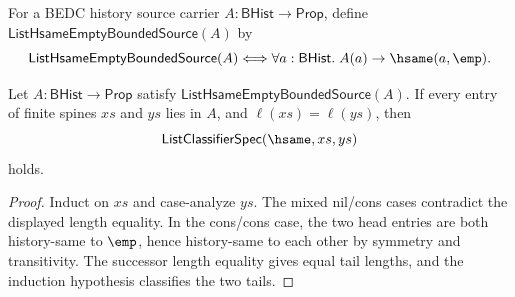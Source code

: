 \begin{definition}
\label{def:list-hsame-empty-bounded-source}
For a BEDC history source carrier $A:\mathsf{BHist}\to\mathsf{Prop}$, define
$\mathsf{ListHsameEmptyBoundedSource}(A)$ by
$$
\mathsf{ListHsameEmptyBoundedSource}(A)
\Longleftrightarrow
\forall a:\mathsf{BHist}.\; A(a)\to\hsame(a,\emp).
$$
\end{definition}

\begin{theorem}
\label{thm:list-hsame-empty-bounded-source-equal-length-classifier}
Let $A:\mathsf{BHist}\to\mathsf{Prop}$ satisfy
$\mathsf{ListHsameEmptyBoundedSource}(A)$. If every entry of finite spines
$xs$ and $ys$ lies in $A$, and $\ell(xs)=\ell(ys)$, then
$$
\mathsf{ListClassifierSpec}(\hsame,xs,ys)
$$
holds.
\end{theorem}
\begin{proof}
Induct on $xs$ and case-analyze $ys$. The mixed nil/cons cases contradict the
displayed length equality. In the cons/cons case, the two head entries are both
history-same to $\emp$, hence history-same to each other by symmetry and
transitivity. The successor length equality gives equal tail lengths, and the
induction hypothesis classifies the two tails.
\end{proof}
